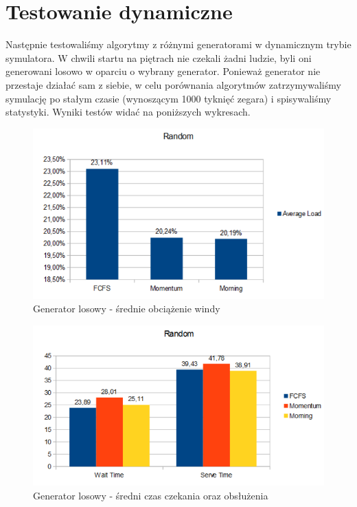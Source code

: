 \documentclass[a4paper,11pt]{article}
\begin{document}
\section{Testowanie dynamiczne}
Następnie testowaliśmy algorytmy z różnymi generatorami w dynamicznym trybie symulatora. W chwili startu na piętrach nie czekali żadni ludzie, byli oni generowani losowo w oparciu o wybrany generator. Ponieważ generator nie przestaje działać sam z siebie, w celu porównania algorytmów zatrzymywaliśmy symulację po stałym czasie (wynoszącym 1000 tyknięć zegara) i spisywaliśmy statystyki. Wyniki testów widać na poniższych wykresach.

\begin{figure}[H]
    \centering
    \caption{Generator losowy - średnie obciążenie windy}
    \includegraphics[width=\textwidth]{r_load.png}
\end{figure}

\begin{figure}[H]
    \centering
    \caption{Generator losowy - średni czas czekania oraz obsłużenia}
    \includegraphics[width=\textwidth]{r_time.png}
\end{figure}
\end{document}
